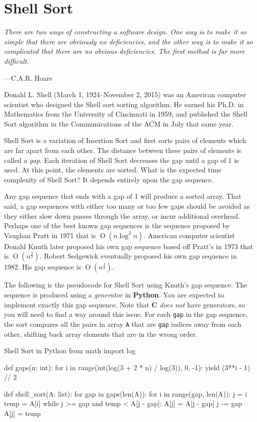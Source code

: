 \section{Shell Sort}

\epigraph{\emph{There are two ways of constructing a software design.
    One way is to make it so simple that there are obviously no
    deficiencies, and the other way is to make it so complicated that
    there are no obvious deficiencies. The first method is far more
difficult.}}{---C.A.R. Hoare}

\noindent Donald L. Shell (March 1, 1924--November 2, 2015) was an
American computer scientist who designed the Shell sort sorting
algorithm. He earned his Ph.D. in Mathematics from the University of
Cincinnati in 1959, and published the Shell Sort algorithm in the
Communications of the ACM in July that same year.

Shell Sort is a variation of Insertion Sort and first sorts pairs of
elements which are far apart from each other. The distance between these
pairs of elements is called a \emph{gap}. Each iteration of Shell Sort
decreases the gap until a gap of 1 is used. At this point, the elements
are sorted. What is the expected time complexity of Shell Sort? It
depends entirely upon the gap sequence.

Any gap sequence that ends with a gap of 1 will produce a sorted array.
That said, a gap sequences with either too many or too few gaps should
be avoided as they either slow down passes through the array, or incur
additional overhead. Perhaps one of the best known gap sequences is the
sequence proposed by Vaughan Pratt in 1971 that is $\operatorname{O}(n
\log^2 n)$. American computer scientist Donald Knuth later proposed his
own gap sequence based off Pratt's in 1973 that is
$\operatorname{O}(n^{\frac{3}{2}})$. Robert Sedgewick eventually
proposed his own gap sequence in 1982. His gap sequence is
$\operatorname{O}(n^{\frac{4}{3}})$.

The following is the pseudocode for Shell Sort using Knuth's gap
sequence. The sequence is produced using a \emph{generator} in
\textbf{Python}. You are expected to implement exactly this gap
sequence. Note that \textbf{C} \emph{does not} have generators, so you
will need to find a way around this issue. For each \texttt{gap} in the
gap sequence, the sort compares all the pairs in array \texttt{A} that
are \texttt{gap} indices away from each other, shifting back array
elements that are in the wrong order.

\begin{pylisting}{Shell Sort in Python}
from math import log

def gaps(n: int):
    for i in range(int(log(3 + 2 * n) / log(3)), 0, -1):
        yield (3**i - 1) // 2

def shell_sort(A: list):
    for gap in gaps(len(A)):
        for i in range(gap, len(A)):
            j = i
            temp = A[i]
            while j >= gap and temp < A[j - gap]:
                A[j] = A[j - gap]
                j -= gap
            A[j] = temp
\end{pylisting}

